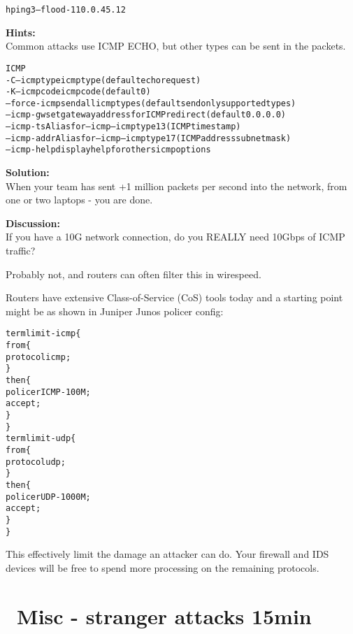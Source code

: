 \documentclass[a4paper,11pt,notitlepage]{report}
\begin{document}
\begin{alltt}\footnotesize
hping3 --flood -1 10.0.45.12
\end{alltt}





{\bf Hints:}\\
Common attacks use ICMP ECHO, but other types can be sent in the packets.

\begin{alltt}\footnotesize
ICMP
  -C  --icmptype   icmp type (default echo request)
  -K  --icmpcode   icmp code (default 0)
      --force-icmp send all icmp types (default send only supported types)
      --icmp-gw    set gateway address for ICMP redirect (default 0.0.0.0)
      --icmp-ts    Alias for --icmp --icmptype 13 (ICMP timestamp)
      --icmp-addr  Alias for --icmp --icmptype 17 (ICMP address subnet mask)
      --icmp-help  display help for others icmp options
\end{alltt}


{\bf Solution:}\\
When your team has sent +1 million packets per second into the network, from one or two laptops - you are done.

{\bf Discussion:}\\
If you have a 10G network connection, do you REALLY need 10Gbps of ICMP traffic?

Probably not, and routers can often filter this in wirespeed.

Routers have extensive Class-of-Service (CoS) tools today and a starting point might be as shown in Juniper Junos policer config:

\begin{alltt}\footnotesize
term limit-icmp \{
    from \{
        protocol icmp;
    \}
    then \{
        policer ICMP-100M;
        accept;
    \}
\}
term limit-udp \{
    from \{
        protocol udp;
    \}
    then \{
        policer UDP-1000M;
        accept;
    \}
\}
\end{alltt}

This effectively limit the damage an attacker can do. Your firewall and IDS devices will be free to spend more processing on the remaining protocols.



\chapter{\faInfoCircle\ Misc - stranger attacks 15min}
\end{document}
